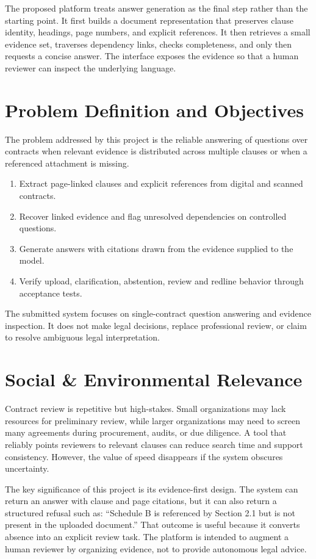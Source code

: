 \documentclass[12pt,a4paper,oneside]{report}
\begin{document}
The proposed platform treats answer generation as the final step rather than the starting point. It first builds a document representation that preserves clause identity, headings, page numbers, and explicit references. It then retrieves a small evidence set, traverses dependency links, checks completeness, and only then requests a concise answer. The interface exposes the evidence so that a human reviewer can inspect the underlying language.

\section{Problem Definition and Objectives}
The problem addressed by this project is the reliable answering of questions over contracts when relevant evidence is distributed across multiple clauses or when a referenced attachment is missing.

\begin{enumerate}
\item Extract page-linked clauses and explicit references from digital and scanned contracts.
\item Recover linked evidence and flag unresolved dependencies on controlled questions.
\item Generate answers with citations drawn from the evidence supplied to the model.
\item Verify upload, clarification, abstention, review and redline behavior through acceptance tests.
\end{enumerate}

The submitted system focuses on single-contract question answering and evidence inspection. It does not make legal decisions, replace professional review, or claim to resolve ambiguous legal interpretation.

\section{Social \& Environmental Relevance}
Contract review is repetitive but high-stakes. Small organizations may lack resources for preliminary review, while larger organizations may need to screen many agreements during procurement, audits, or due diligence. A tool that reliably points reviewers to relevant clauses can reduce search time and support consistency. However, the value of speed disappears if the system obscures uncertainty.

The key significance of this project is its evidence-first design. The system can return an answer with clause and page citations, but it can also return a structured refusal such as: ``Schedule B is referenced by Section 2.1 but is not present in the uploaded document.'' That outcome is useful because it converts absence into an explicit review task. The platform is intended to augment a human reviewer by organizing evidence, not to provide autonomous legal advice.
\end{document}
